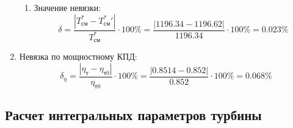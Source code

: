 \documentclass[a4paper,10pt]{article}
\begin{document}
\begin{enumerate}
\begin{enumerate}
            \item Значение невязки:
            \[
                \delta = \frac{ \left| T_{см}^{*} - T_{см}^*\prime \right| }{T_{см}^{*}} \cdot 100 \% =
                    \frac{
                        \left| 1196.34 - 1196.62 \right|
                    }{
                        1196.34
                    } \cdot 100 \% =
                0.023 \%
            \]

        \end{enumerate}

        

        \item Невязка по мощностному КПД:
        \[
            \delta_\eta = \frac{ \left| \eta_т - \eta_{т0} \right| }{ \eta_{т0} } \cdot 100 \% =
                \frac{
                    \left| 0.8514 - 0.852 \right|
                }{
                    0.852 } \cdot 100 \% =
            0.068 \%
        \]

    \end{enumerate}
     

    \subsection{Расчет интегральных параметров турбины}

    
\end{document}
